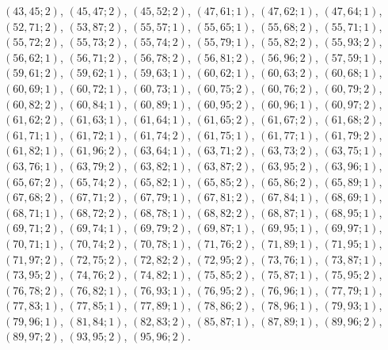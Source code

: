 \documentclass[11pt]{article}
\begin{document}
$(43,45;2)$, $(45,47;2)$, $(45,52;2)$, $(47,61;1)$, $(47,62;1)$, $(47,64;1)$, $(52,71;2)$, $(53,87;2)$, $(55,57;1)$, $(55,65;1)$, $(55,68;2)$, $(55,71;1)$, $(55,72;2)$, $(55,73;2)$, $(55,74;2)$, $(55,79;1)$, $(55,82;2)$, $(55,93;2)$, $(56,62;1)$, $(56,71;2)$, $(56,78;2)$, $(56,81;2)$, $(56,96;2)$, $(57,59;1)$, $(59,61;2)$, $(59,62;1)$, $(59,63;1)$, $(60,62;1)$, $(60,63;2)$, $(60,68;1)$, $(60,69;1)$, $(60,72;1)$, $(60,73;1)$, $(60,75;2)$, $(60,76;2)$, $(60,79;2)$, $(60,82;2)$, $(60,84;1)$, $(60,89;1)$, $(60,95;2)$, $(60,96;1)$, $(60,97;2)$, $(61,62;2)$, $(61,63;1)$, $(61,64;1)$, $(61,65;2)$, $(61,67;2)$, $(61,68;2)$, $(61,71;1)$, $(61,72;1)$, $(61,74;2)$, $(61,75;1)$, $(61,77;1)$, $(61,79;2)$, $(61,82;1)$, $(61,96;2)$, $(63,64;1)$, $(63,71;2)$, $(63,73;2)$, $(63,75;1)$, $(63,76;1)$, $(63,79;2)$, $(63,82;1)$, $(63,87;2)$, $(63,95;2)$, $(63,96;1)$, $(65,67;2)$, $(65,74;2)$, $(65,82;1)$, $(65,85;2)$, $(65,86;2)$, $(65,89;1)$, $(67,68;2)$, $(67,71;2)$, $(67,79;1)$, $(67,81;2)$, $(67,84;1)$, $(68,69;1)$, $(68,71;1)$, $(68,72;2)$, $(68,78;1)$, $(68,82;2)$, $(68,87;1)$, $(68,95;1)$, $(69,71;2)$, $(69,74;1)$, $(69,79;2)$, $(69,87;1)$, $(69,95;1)$, $(69,97;1)$, $(70,71;1)$, $(70,74;2)$, $(70,78;1)$, $(71,76;2)$, $(71,89;1)$, $(71,95;1)$, $(71,97;2)$, $(72,75;2)$, $(72,82;2)$, $(72,95;2)$, $(73,76;1)$, $(73,87;1)$, $(73,95;2)$, $(74,76;2)$, $(74,82;1)$, $(75,85;2)$, $(75,87;1)$, $(75,95;2)$, $(76,78;2)$, $(76,82;1)$, $(76,93;1)$, $(76,95;2)$, $(76,96;1)$, $(77,79;1)$, $(77,83;1)$, $(77,85;1)$, $(77,89;1)$, $(78,86;2)$, $(78,96;1)$, $(79,93;1)$, $(79,96;1)$, $(81,84;1)$, $(82,83;2)$, $(85,87;1)$, $(87,89;1)$, $(89,96;2)$, $(89,97;2)$, $(93,95;2)$, $(95,96;2)$.
\end{document}
